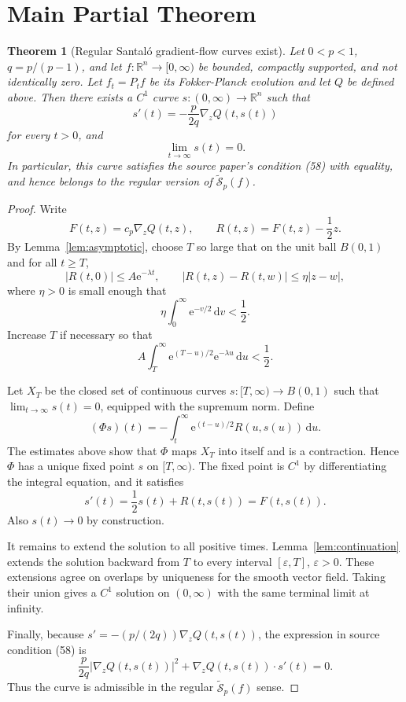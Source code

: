 \documentclass[11pt]{article}
\newtheorem{theorem}{Theorem}
\newcommand{\R}{\mathbb R}
\newcommand{\e}{\mathrm e}
\newcommand{\dd}{\,\mathrm d}
\newcommand{\grad}{\nabla}
\begin{document}
\section*{Main Partial Theorem}

\begin{theorem}[Regular Santaló gradient-flow curves exist]
\label{thm:main}
Let $0<p<1$, $q=p/(p-1)$, and let $f:\R^n\to[0,\infty)$ be bounded, compactly
supported, and not identically zero. Let $f_t=P_t f$ be its Fokker-Planck
evolution and let $Q$ be defined above. Then there exists a $C^1$ curve
$s:(0,\infty)\to\R^n$ such that
\[
  s'(t)=-\frac{p}{2q}\grad_z Q(t,s(t))
\]
for every $t>0$, and
\[
  \lim_{t\to\infty}s(t)=0.
\]
In particular, this curve satisfies the source paper's condition (58) with
equality, and hence belongs to the regular version of
$\widetilde{\mathcal S}_p(f)$.
\end{theorem}

\begin{proof}
Write
\[
  F(t,z)=c_p\grad_zQ(t,z),\qquad
  R(t,z)=F(t,z)-\frac12z .
\]
By Lemma~\ref{lem:asymptotic}, choose $T$ so large that on the unit ball
$B(0,1)$ and for all $t\ge T$,
\[
  |R(t,0)|\le A\e^{-\lambda t},
  \qquad
  |R(t,z)-R(t,w)|\le \eta |z-w|,
\]
where $\eta>0$ is small enough that
\[
  \eta\int_0^\infty \e^{-v/2}\dd v <\frac12.
\]
Increase $T$ if necessary so that
\[
  A\int_T^\infty \e^{(T-u)/2}\e^{-\lambda u}\dd u<\frac12.
\]

Let $X_T$ be the closed set of continuous curves
$s:[T,\infty)\to B(0,1)$ such that $\lim_{t\to\infty}s(t)=0$, equipped with
the supremum norm. Define
\[
  (\Phi s)(t)=
  -\int_t^\infty \e^{(t-u)/2}R(u,s(u))\dd u .
\]
The estimates above show that $\Phi$ maps $X_T$ into itself and is a
contraction. Hence $\Phi$ has a unique fixed point $s$ on $[T,\infty)$. The
fixed point is $C^1$ by differentiating the integral equation, and it satisfies
\[
  s'(t)=\frac12s(t)+R(t,s(t))=F(t,s(t)).
\]
Also $s(t)\to0$ by construction.

It remains to extend the solution to all positive times. Lemma~\ref{lem:continuation}
extends the solution backward from $T$ to every interval $[\varepsilon,T]$,
$\varepsilon>0$. These extensions agree on overlaps by uniqueness for the
smooth vector field. Taking their union gives a $C^1$ solution on
$(0,\infty)$ with the same terminal limit at infinity.

Finally, because $s'=-(p/(2q))\grad_zQ(t,s(t))$, the expression in source
condition (58) is
\[
  \frac{p}{2q}|\grad_zQ(t,s(t))|^2
  +\grad_zQ(t,s(t))\cdot s'(t)=0.
\]
Thus the curve is admissible in the regular $\widetilde{\mathcal S}_p(f)$
sense.
\end{proof}
\end{document}

